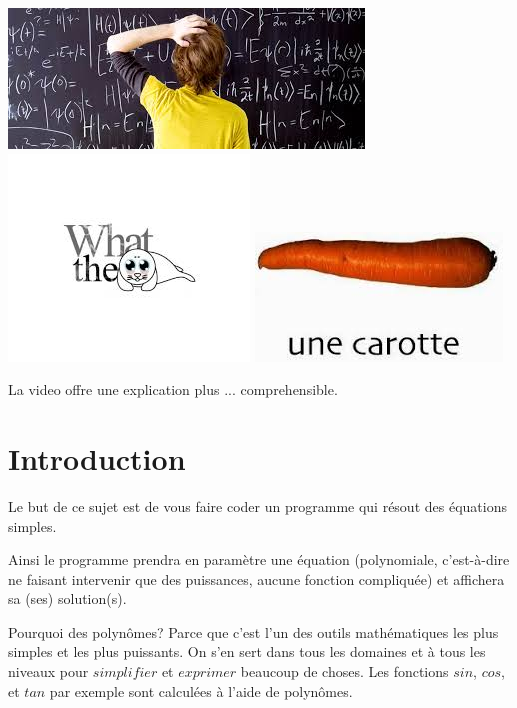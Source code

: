 \documentclass{42}
\begin{document}
\begin{center}
	\includegraphics[scale=0.35]{what6}
	\includegraphics[scale=0.35]{what7}
	\includegraphics[scale=0.35]{what8}
\end{center}

\hint
{
	La video offre une explication plus ... comprehensible.
}

\newpage

\chapter{Introduction}

Le but de ce sujet est de vous faire coder un programme qui résout des équations simples.

Ainsi le programme prendra en paramètre une équation (polynomiale, c'est-à-dire ne faisant intervenir que des puissances, aucune fonction compliquée) et affichera sa (ses) solution(s).

Pourquoi des polynômes? Parce que c'est l'un des outils mathématiques les plus simples et les plus puissants. On s'en sert dans tous les domaines et à tous les niveaux pour $simplifier$ et $exprimer$ beaucoup de choses. Les fonctions $sin$, $cos$, et $tan$ par exemple sont calculées à l'aide de polynômes.
\end{document}
